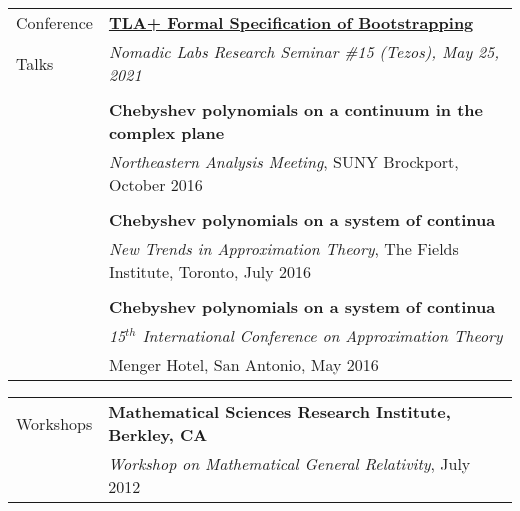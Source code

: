 \documentclass[letterpaper,10pt,oneside]{article}
\begin{document}
\noindent \begin{tabular}{@{} l l}
 \Large{Conference} & \href{https://www.youtube.com/watch?v=WgO2hHt2GrQ}{\textbf{TLA+ Formal Specification of Bootstrapping}} \\
 \Large{Talks} & \emph{Nomadic Labs Research Seminar \#15 (Tezos), May 25, 2021} \\
 & \\
 \hspace{1.1in} & \textbf{Chebyshev polynomials on a continuum in the complex plane}  \\
 & \emph{Northeastern Analysis Meeting}, SUNY Brockport, October 2016 \\
 & \\
 & \textbf{Chebyshev polynomials on a system of continua} \\
 & \emph{New Trends in Approximation Theory}, The Fields Institute, Toronto, July 2016 \\
 & \\
 & \textbf{Chebyshev polynomials on a system of continua} \\
 & \emph{15$^{th}$ International Conference on Approximation Theory} \\
 & Menger Hotel, San Antonio, May 2016 \\
\end{tabular}

\vfill


\noindent \begin{tabular}{@{} l l}
 \Large{Workshops} & \textbf{Mathematical Sciences Research Institute, Berkley, CA} \\
 \hspace{1.1in} & \emph{Workshop on Mathematical General Relativity}, July 2012 \\
\end{tabular}

\vfill
\end{document}
